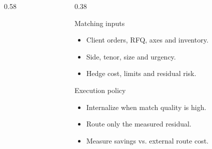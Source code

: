 \documentclass[aspectratio=169,10pt]{beamer}
\newcommand{\tightitems}{\setlength{\itemsep}{0.20em}}
\begin{document}
\begin{frame}[plain]
\begin{columns}[T,totalwidth=\textwidth]
\begin{column}{0.58\textwidth}
\end{column}
\begin{column}{0.38\textwidth}
\begin{block}{Matching inputs}
\begin{itemize}\tightitems
  \item Client orders, RFQ, axes and inventory.
  \item Side, tenor, size and urgency.
  \item Hedge cost, limits and residual risk.
\end{itemize}
\end{block}
\begin{block}{Execution policy}
\begin{itemize}\tightitems
  \item Internalize when match quality is high.
  \item Route only the measured residual.
  \item Measure savings vs. external route cost.
\end{itemize}
\end{block}
\end{column}
\end{columns}
\end{frame}
\end{document}
